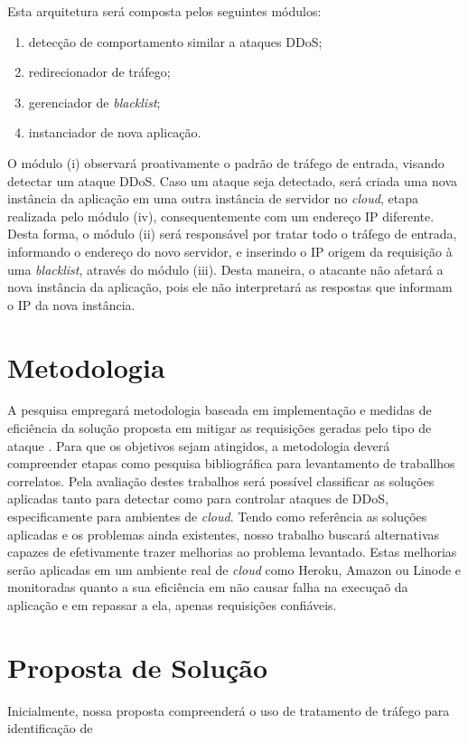 \documentclass[a4paper, 11pt]{article}
\begin{document}
Esta arquitetura será composta pelos seguintes módulos:
\begin{enumerate}[i]
  \item detecção de comportamento similar a ataques DDoS;
  \item redirecionador de tráfego;
  \item gerenciador de \emph{blacklist};
  \item instanciador de nova aplica\c{c}\~{a}o.
\end{enumerate}  

O módulo (i) observará proativamente o padrão de tráfego de entrada, visando
detectar um ataque DDoS. Caso um ataque seja detectado, será criada uma nova
instância da aplicação em uma outra instância de servidor no \emph{cloud}, etapa
realizada pelo m\'odulo (iv), consequentemente com um endereço IP diferente.
Desta forma, o módulo (ii) será responsável por tratar todo o tráfego de
entrada, informando o endereço do novo servidor, e inserindo o IP origem da
requisição à uma \emph{blacklist}, através do módulo (iii). Desta maneira, o
atacante não afetará a nova instância da aplicação, pois ele não interpretará as
respostas que informam o IP da nova instância. 


\section{Metodologia}
A pesquisa empregar\'a metodologia baseada em implementa\c{c}\~{a}o e medidas de
efici\^encia da solu\c{c}\~{a}o proposta em mitigar as requisi\c{c}\~oes geradas
pelo
tipo de ataque . Para que os objetivos sejam atingidos, a metodologia dever\'a
compreender etapas como pesquisa bibliogr\'afica para levantamento de traballhos
correlatos. Pela avalia\c{c}\~{a}o destes trabalhos ser\'a poss\'ivel
classificar as
solu\c{c}\~oes aplicadas tanto para detectar como para controlar ataques de
DDoS,
especificamente para ambientes de \emph{cloud}. Tendo como refer\^encia as
solu\c{c}\~oes aplicadas e os problemas ainda existentes, nosso trabalho
buscar\'a
alternativas capazes de efetivamente trazer melhorias ao problema levantado.
Estas melhorias ser\~ao aplicadas em um ambiente real de \emph{cloud} como
Heroku, Amazon
ou Linode e monitoradas quanto a sua efici\^encia em n\~ao causar falha na
execu\c{c}a\~o da aplica\c{c}\~{a}o e em repassar a ela, apenas requisições
confi\'aveis.


\section{Proposta de Solu\c{c}\~{a}o}
Inicialmente, nossa proposta compreender\'a o uso de tratamento de tr\'afego
para identifica\c{c}\~{a}o de 
\end{document}

